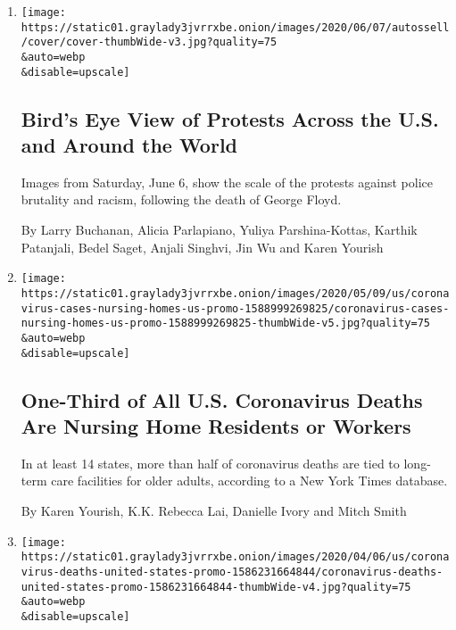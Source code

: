 \begin{enumerate}
\def\labelenumi{\arabic{enumi}.}
\item
  \href{/interactive/2020/06/07/us/george-floyd-protest-aerial-photos.html}{}

  \texttt{[image: https://static01.graylady3jvrrxbe.onion/images/2020/06/07/autossell/cover/cover-thumbWide-v3.jpg?quality=75\\\&auto=webp\\\&disable=upscale]}

  \hypertarget{birds-eye-view-of-protests-across-the-us-and-around-the-world}{%
  \subsection{Bird's Eye View of Protests Across the U.S. and Around the
  World}\label{birds-eye-view-of-protests-across-the-us-and-around-the-world}}

  Images from Saturday, June 6, show the scale of the protests against
  police brutality and racism, following the death of George Floyd.

  By Larry Buchanan, Alicia Parlapiano, Yuliya Parshina-Kottas, Karthik
  Patanjali, Bedel Saget, Anjali Singhvi, Jin Wu and Karen Yourish
\item
  \href{/interactive/2020/05/09/us/coronavirus-cases-nursing-homes-us.html}{}

  \texttt{[image: https://static01.graylady3jvrrxbe.onion/images/2020/05/09/us/coronavirus-cases-nursing-homes-us-promo-1588999269825/coronavirus-cases-nursing-homes-us-promo-1588999269825-thumbWide-v5.jpg?quality=75\\\&auto=webp\\\&disable=upscale]}

  \hypertarget{one-third-of-all-us-coronavirus-deaths-are-nursing-home-residents-or-workers}{%
  \subsection{One-Third of All U.S. Coronavirus Deaths Are Nursing Home
  Residents or
  Workers}\label{one-third-of-all-us-coronavirus-deaths-are-nursing-home-residents-or-workers}}

  In at least 14 states, more than half of coronavirus deaths are tied
  to long-term care facilities for older adults, according to a New York
  Times database.

  By Karen Yourish, K.K. Rebecca Lai, Danielle Ivory and Mitch Smith
\item
  \href{/interactive/2020/04/06/us/coronavirus-deaths-united-states.html}{}

  \texttt{[image: https://static01.graylady3jvrrxbe.onion/images/2020/04/06/us/coronavirus-deaths-united-states-promo-1586231664844/coronavirus-deaths-united-states-promo-1586231664844-thumbWide-v4.jpg?quality=75\\\&auto=webp\\\&disable=upscale]}


\end{enumerate}

